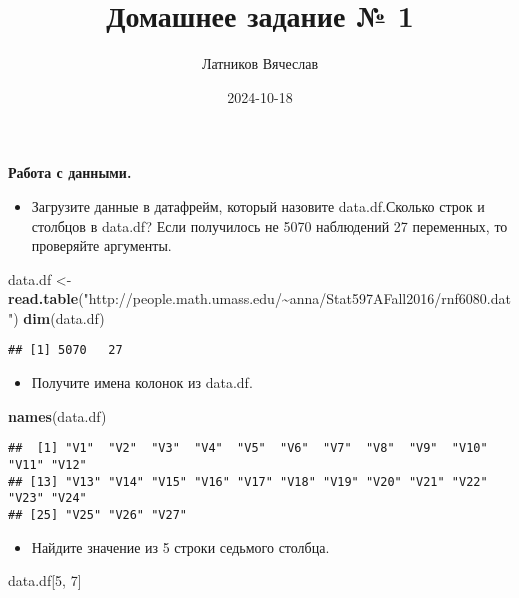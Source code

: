 \documentclass[
]{article}
\title{Домашнее задание № 1}
\author{Латников Вячеслав}
\date{2024-10-18}
\newenvironment{Shaded}{\begin{snugshade}}{\end{snugshade}}
\newcommand{\DecValTok}[1]{\textcolor[rgb]{0.00,0.00,0.81}{#1}}
\newcommand{\FunctionTok}[1]{\textcolor[rgb]{0.13,0.29,0.53}{\textbf{#1}}}
\newcommand{\NormalTok}[1]{#1}
\newcommand{\OtherTok}[1]{\textcolor[rgb]{0.56,0.35,0.01}{#1}}
\newcommand{\StringTok}[1]{\textcolor[rgb]{0.31,0.60,0.02}{#1}}
\providecommand{\tightlist}{%
  \setlength{\itemsep}{0pt}\setlength{\parskip}{0pt}}
\begin{document}
\maketitle

\textbf{Работа с данными.}

\begin{itemize}
\tightlist
\item
  Загрузите данные в датафрейм, который назовите data.df.Сколько строк и
  столбцов в data.df? Если получилось не 5070 наблюдений 27 переменных,
  то проверяйте аргументы.
\end{itemize}

\begin{Shaded}
\begin{Highlighting}[]
\NormalTok{data.df }\OtherTok{\textless{}{-}} \FunctionTok{read.table}\NormalTok{(}\StringTok{"http://people.math.umass.edu/\textasciitilde{}anna/Stat597AFall2016/rnf6080.dat"}\NormalTok{)}
\FunctionTok{dim}\NormalTok{(data.df)}
\end{Highlighting}
\end{Shaded}

\begin{verbatim}
## [1] 5070   27
\end{verbatim}

\begin{itemize}
\tightlist
\item
  Получите имена колонок из data.df.
\end{itemize}

\begin{Shaded}
\begin{Highlighting}[]
\FunctionTok{names}\NormalTok{(data.df)}
\end{Highlighting}
\end{Shaded}

\begin{verbatim}
##  [1] "V1"  "V2"  "V3"  "V4"  "V5"  "V6"  "V7"  "V8"  "V9"  "V10" "V11" "V12"
## [13] "V13" "V14" "V15" "V16" "V17" "V18" "V19" "V20" "V21" "V22" "V23" "V24"
## [25] "V25" "V26" "V27"
\end{verbatim}

\begin{itemize}
\tightlist
\item
  Найдите значение из 5 строки седьмого столбца.
\end{itemize}

\begin{Shaded}
\begin{Highlighting}[]
\NormalTok{data.df[}\DecValTok{5}\NormalTok{, }\DecValTok{7}\NormalTok{]}
\end{Highlighting}
\end{Shaded}
\end{document}
